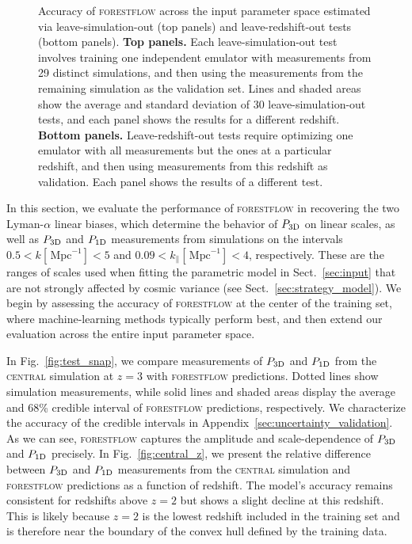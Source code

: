 \documentclass[longauth]{aa}
\newcommand{\poned}{\ensuremath{P_{\rm 1D}}\xspace}
\newcommand{\pthreed}{\ensuremath{P_{\rm 3D}}\xspace}
\newcommand{\forestflow}{\textsc{forestflow}\xspace}
\newcommand{\simcentral}{\textsc{central}\xspace}
\newcommand{\iMpc}{\ensuremath{\,\mathrm{Mpc}^{-1}}}
\begin{document}
\begin{figure}
\caption{Accuracy of \forestflow across the input parameter space estimated via leave-simulation-out (top panels) and leave-redshift-out tests (bottom panels). {\bf Top panels.} Each leave-simulation-out test involves training one independent emulator with measurements from 29 distinct simulations, and then using the measurements from the remaining simulation as the validation set. Lines and shaded areas show the average and standard deviation of 30 leave-simulation-out tests, and each panel shows the results for a different redshift. {\bf Bottom panels.} Leave-redshift-out tests require optimizing one emulator with all measurements but the ones at a particular redshift, and then using measurements from this redshift as validation. Each panel shows the results of a different test.
}
\label{fig:leave_sim_out}
\end{figure}

In this section, we evaluate the performance of \forestflow in recovering the two Lyman-$\alpha$ linear biases, which determine the behavior of \pthreed on linear scales, as well as \pthreed and \poned measurements from simulations on the intervals $0.5<k[\iMpc]<5$ and $0.09<k_\parallel[\iMpc]<4$, respectively. These are the ranges of scales used when fitting the parametric model in Sect.~\ref{sec:input} that are not strongly affected by cosmic variance (see Sect.~\ref{sec:strategy_model}). We begin by assessing the accuracy of \forestflow at the center of the training set, where machine-learning methods typically perform best, and then extend our evaluation across the entire input parameter space.

In Fig.~\ref{fig:test_snap}, we compare measurements of \pthreed and \poned from the \simcentral simulation at $z=3$ with \forestflow predictions. Dotted lines show simulation measurements, while solid lines and shaded areas display the average and 68\% credible interval of \forestflow predictions, respectively. We characterize the accuracy of the credible intervals in Appendix~\ref{sec:uncertainty_validation}. As we can see, \forestflow captures the amplitude and scale-dependence of \pthreed and \poned precisely. 
In Fig.~\ref{fig:central_z}, we present the relative difference between \pthreed and \poned measurements from the \simcentral simulation and \forestflow predictions as a function of redshift. The model's accuracy remains consistent for redshifts above $z=2$ but shows a slight decline at this redshift. This is likely because $z=2$ is the lowest redshift included in the training set and is therefore near the boundary of the convex hull defined by the training data.
\end{document}
